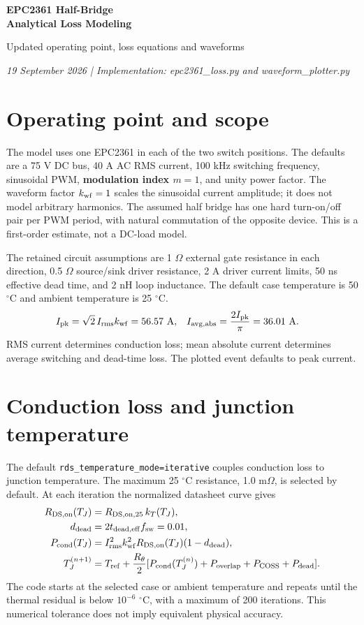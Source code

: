 \documentclass[11pt,a4paper]{article}
\begin{document}
{\LARGE\bfseries\color{accent} EPC2361 Half-Bridge\\[4pt]Analytical Loss Modeling}\par
{\large Updated operating point, loss equations and waveforms}\par
\textit{19 September 2026 | Implementation: epc2361\_loss.py and waveform\_plotter.py}

\section{Operating point and scope}
The model uses one EPC2361 in each of the two switch positions. The defaults are a
75 V DC bus, 40 A AC RMS current, 100 kHz switching frequency, sinusoidal PWM,
\textbf{modulation index $m=1$}, and unity power factor. The waveform factor $k_{\rm wf}=1$
scales the sinusoidal current amplitude; it does not model arbitrary harmonics.
The assumed half bridge has one hard turn-on/off pair per PWM period, with natural
commutation of the opposite device. This is a first-order estimate, not a DC-load model.

The retained circuit assumptions are 1 $\Omega$ external gate resistance in each
direction, 0.5 $\Omega$ source/sink driver resistance, 2 A driver current limits,
50 ns effective dead time, and 2 nH loop inductance. The default case temperature is
50 $^\circ$C and ambient temperature is 25 $^\circ$C.
\begin{align*}
 I_{\rm pk}&=\sqrt{2}\,I_{\rm rms}k_{\rm wf}=56.57\ {\rm A}, &
 I_{\rm avg,abs}&=\frac{2I_{\rm pk}}{\pi}=36.01\ {\rm A}.
\end{align*}
RMS current determines conduction loss; mean absolute current determines average
switching and dead-time loss. The plotted event defaults to peak current.

\section{Conduction loss and junction temperature}
The default \texttt{rds\_temperature\_mode=iterative} couples conduction loss to
junction temperature. The maximum 25 $^\circ$C resistance, 1.0 m$\Omega$, is selected
by default. At each iteration the normalized datasheet curve gives
\begin{align*}
 R_{\rm DS,on}(T_J)&=R_{\rm DS,on,25}\,k_T(T_J),\\
 d_{\rm dead}&=2t_{\rm dead,eff}f_{\rm sw}=0.01,\\
 P_{\rm cond}(T_J)&=I_{\rm rms}^{2}k_{\rm wf}^{2}R_{\rm DS,on}(T_J)(1-d_{\rm dead}),\\
 T_J^{(n+1)}&=T_{\rm ref}+\frac{R_\theta}{2}
 [P_{\rm cond}(T_J^{(n)})+P_{\rm overlap}+P_{\rm COSS}+P_{\rm dead}].
\end{align*}
The code starts at the selected case or ambient temperature and repeats until the
thermal residual is below $10^{-6}$ $^\circ$C, with a maximum of 200 iterations.
This numerical tolerance does not imply equivalent physical accuracy.
\end{document}
